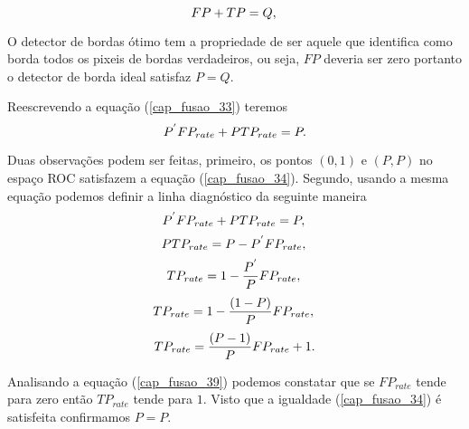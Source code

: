 \begin{equation}\label{cap_fusao_33}
      FP+TP = Q, \\
\end{equation}

O detector de bordas ótimo tem a propriedade de ser aquele que identifica como borda todos os pixeis de bordas verdadeiros, ou seja, $FP$ deveria ser zero portanto o detector de borda ideal satisfaz $P=Q$. 


Reescrevendo a equação (\ref{cap_fusao_33}) teremos
\begin{equation}\label{cap_fusao_34}
     P^{'}FP_{rate}+P TP_{rate} = P. \\
\end{equation}

Duas observações podem ser feitas, primeiro, os pontos $(0,1)$ e $(P,P)$ no espaço ROC satisfazem a equação (\ref{cap_fusao_34}). Segundo, usando a mesma equação podemos definir a linha diagnóstico da seguinte maneira
\begin{equation}\label{cap_fusao_35}
     P^{'}FP_{rate}+P TP_{rate} = P, \\
\end{equation}
\begin{equation}\label{cap_fusao_36}
     P TP_{rate} = P - P^{'}FP_{rate}, \\
\end{equation}
\begin{equation}\label{cap_fusao_37}
    TP_{rate} = 1 - \frac{P^{'}}{P}FP_{rate}, \\
\end{equation}
\begin{equation}\label{cap_fusao_38}
    TP_{rate} = 1 - \frac{(1-P)}{P}FP_{rate}, \\
\end{equation}
\begin{equation}\label{cap_fusao_39}
    TP_{rate} = \frac{(P-1)}{P}FP_{rate} + 1. \\
\end{equation}

Analisando a equação (\ref{cap_fusao_39}) podemos constatar que se $FP_{rate}$ tende para zero então $TP_{rate}$ tende para $1$. Visto que a igualdade (\ref{cap_fusao_34}) é satisfeita confirmamos $P=P$. 

